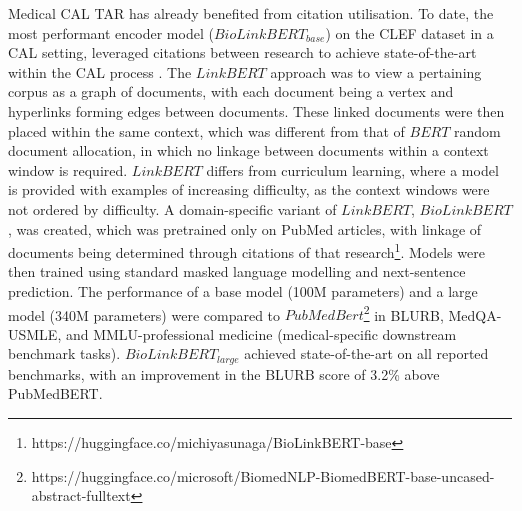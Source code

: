 \documentclass[../main.tex]{subfiles}
\begin{document}
Medical CAL TAR has already benefited from citation utilisation. To date, the most performant encoder model ($BioLinkBERT_{base}$) \cite{yasunaga2022linkbertpretraininglanguagemodels} on the CLEF dataset in a CAL setting, leveraged citations between research to achieve state-of-the-art within the CAL process \cite{goharian_reproducibility_2024}. The $LinkBERT$ approach was to view a pertaining corpus as a graph of documents, with each document being a vertex and hyperlinks forming edges between documents. These linked documents were then placed within the same context, which was different from that of $BERT$ random document allocation, in which no linkage between documents within a context window is required. $LinkBERT$ differs from curriculum learning, where a model is provided with examples of increasing difficulty, as the context windows were not ordered by difficulty. A domain-specific variant of $LinkBERT$, $BioLinkBERT$, was created, which was pretrained only on  PubMed articles, with linkage of documents being determined through citations of that research\footnote{https://huggingface.co/michiyasunaga/BioLinkBERT-base}. Models were then trained using standard masked language modelling and next-sentence prediction. The performance of a base model (100M parameters) and a large model (340M parameters) were compared to $PubMedBert$\footnote{https://huggingface.co/microsoft/BiomedNLP-BiomedBERT-base-uncased-abstract-fulltext} in BLURB\cite{guDomainSpecificLanguageModel2021}, MedQA-USMLE\cite{jinWhatDiseaseDoes2020}, and MMLU-professional medicine (medical-specific downstream benchmark tasks)\cite{hendrycksMeasuringMassiveMultitask2021}. $BioLinkBERT_{large}$ achieved state-of-the-art on all reported benchmarks, with an improvement in the BLURB score of 3.2\% above PubMedBERT. 
\end{document}

